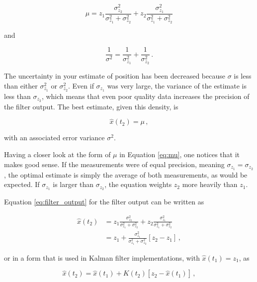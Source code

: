 \begin{equation}\label{eq:mu}
  \mu=z_1\frac{\sigma^2_{z_2}}{\sigma^2_{z_1}+\sigma^2_{z_2}}+z_2\frac{\sigma^2_{z_1}}{\sigma^2_{z_1}+\sigma^2_{z_2}}
\end{equation}

\noindent
and

\begin{equation}
  \frac{1}{\sigma^2}=\frac{1}{\sigma^2_{z_1}}+\frac{1}{\sigma^2_{z_2}}\,.
\end{equation}

\noindent
The uncertainty in your estimate of position has been decreased because $\sigma$ is less than either $\sigma^2_{z_1}$ or $\sigma^2_{z_2}$. Even if $\sigma_{z_1}$ was very large, the variance of the estimate is less than $\sigma_{z_2}$, which means that even poor quality data increases the precision of the filter output. The best estimate, given this density, is

\begin{equation}\label{eq:filter_output}
  \hat{x}(t_2)=\mu\,,
\end{equation}

\noindent
with an associated error variance $\sigma^2$.

Having a closer look at the form of $\mu$ in Equation \ref{eq:mu}, one notices that it makes good sense. If the measurements were of equal precision, meaning $\sigma_{z_1}=\sigma_{z_2}$, the optimal estimate is simply the average of both measurements, as would be expected. If $\sigma_{z_1}$ is larger than $\sigma_{z_2}$, the equation weights $z_2$ more heavily than $z_1$.

Equation \ref{eq:filter_output} for the filter output can be written as

\begin{equation}\label{eq:x2_hat}
\begin{split}
  \hat{x}(t_2) & =z_1\frac{\sigma^2_{z_2}}{\sigma^2_{z_1}+\sigma^2_{z_2}}+z_2\frac{\sigma^2_{z_1}}{\sigma^2_{z_1}+\sigma^2_{z_2}} \\
  & =z_1+\frac{\sigma^2_{z_1}}{\sigma^2_{z_1}+\sigma^2_{z_2}}[z_2-z_1]\,,
\end{split}
\end{equation}

\noindent
or in a form that is used in Kalman filter implementations, with $\hat{x}(t_1)=z_1$, as

\begin{equation}\label{eq:x2_hat_kalman}
  \hat{x}(t_2) = \hat{x}(t_1) + K(t_2)[z_2-\hat{x}(t_1)]\,,
\end{equation}

